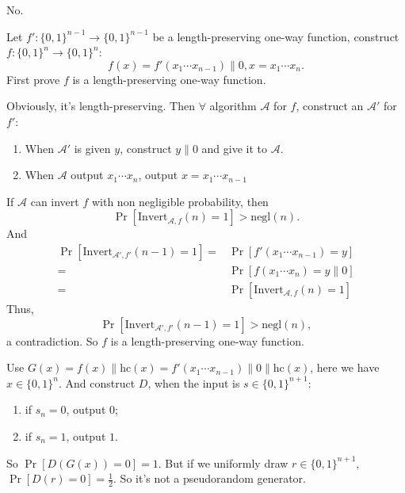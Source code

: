 \documentclass[a4paper]{article}
\newcommand{\negl}{\text{negl}}
\newcommand{\Invert}{\text{Invert}}
\newcommand{\hc}{\text{hc}}
\newcommand{\A}{\mathcal{A}}
\newenvironment{problem}[2][Problem]{\begin{trivlist}
\item[\hskip \labelsep {\bfseries #1}\hskip \labelsep {\bfseries #2.}]}{\end{trivlist}}
\begin{document}
\begin{problem}{7.6} No.\par
Let $f':\{0,1\}^{n-1}\rightarrow\{0,1\}^{n-1}$ be a length-preserving one-way function, construct $f:\{0,1\}^{n}\rightarrow\{0,1\}^{n}$:
\[f(x)=f'(x_1\cdots x_{n-1})\|0,x=x_1\cdots x_n.\]
First prove $f$ is a length-preserving one-way function. \par
Obviously, it's length-preserving. Then $\forall$ algorithm $\A$ for $f$, construct an $\A'$ for $f'$:\begin{enumerate}
    \item When $\A'$ is given $y$, construct $y\|0$ and give it to $\A$.
    \item When $\A$ output $x_1\cdots x_n$, output $x=x_1\cdots x_{n-1}$
\end{enumerate}
If $\A$ can invert $f$ with non negligible probability, then \[\Pr[\Invert_{\A,f}(n)=1]>\negl(n).\] 
And \begin{align*}
    \Pr[\Invert_{\A',f'}(n-1)=1]=&\Pr[f'(x_1\cdots x_{n-1})=y]\\
    =&\Pr[f(x_1\cdots x_{n})=y\|0]\\
    =&\Pr[\Invert_{\A,f}(n)=1]
\end{align*}
Thus, \[\Pr[\Invert_{\A',f'}(n-1)=1]>\negl(n),\] a contradiction.
So $f$ is a length-preserving one-way function.\par
Use $G(x)=f(x)\|\hc(x)=f'(x_1\cdots x_{n-1})\|0\|\hc(x)$, here we have $x\in\{0,1\}^n$. And construct $D$, when the input is $s\in\{0,1\}^{n+1}$:
\begin{enumerate}
    \item if $s_n=0$, output $0$;
    \item if $s_n=1$, output $1$.
\end{enumerate}
So $\Pr[D(G(x))=0]=1$. But if we uniformly draw $r\in\{0,1\}^{n+1}$, $\Pr[D(r)=0]=\frac12$. So it's not a pseudorandom generator.
\end{problem}
\end{document}
